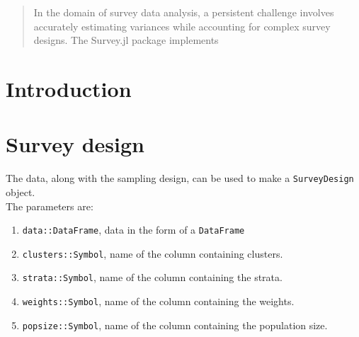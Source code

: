 \documentclass{juliacon}
\begin{document}


\maketitle

\begin{abstract}

In the domain of survey data analysis, a persistent challenge involves accurately estimating variances while accounting for complex survey designs. The Survey.jl package implements 

\end{abstract}

\section{Introduction}

\section{Survey design}

The data, along with the sampling design, can be used to make a \verb|SurveyDesign| object.
\\
The parameters are: 
\begin{enumerate}
    \item \verb|data::DataFrame|, data in the form of a \verb|DataFrame|
    \item \verb|clusters::Symbol|, name of the column containing clusters.
    \item \verb|strata::Symbol|, name of the column containing the strata.
    \item \verb|weights::Symbol|, name of the column containing the weights.
    \item \verb|popsize::Symbol|, name of the column containing the population size. 
\end{enumerate}




\end{document}

